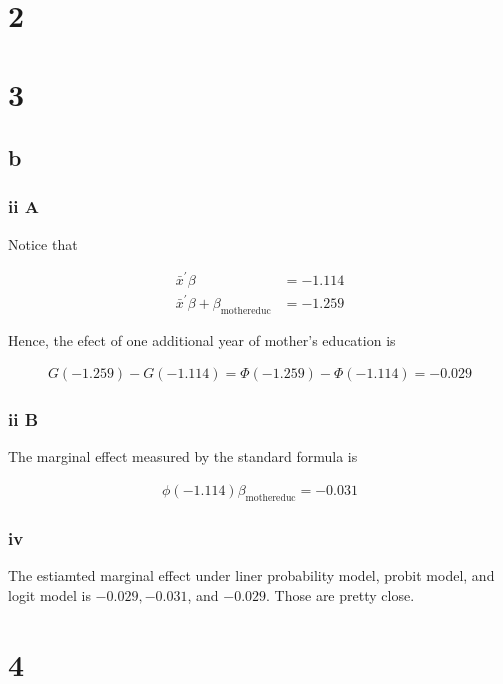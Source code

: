 \documentclass[11pt]{article}
\begin{document}
\section*{2}
\section*{3}

\subsection*{b}

\subsubsection*{ii A}

Notice that

\begin{align*}
    \bar{x}^\prime \beta &= -1.114 \\
    \bar{x}^\prime \beta + \beta_{\text{mothereduc}}&= -1.259
\end{align*}

Hence, the efect of one additional year of mother's education is

\begin{align*}
    G(-1.259) - G(-1.114)  = \Phi(-1.259) - \Phi(-1.114) = - 0.029
\end{align*}

\subsubsection*{ii B}

The marginal effect measured by the standard formula is

\begin{align*}
    \phi(-1.114) \beta_{\text{mothereduc}} = -0.031
\end{align*}

\subsubsection*{iv}

The estiamted marginal effect under liner probability model, probit model, and logit model is $-0.029, -0.031$, and $-0.029$. Those are pretty close.

\section*{4}
\end{document}
